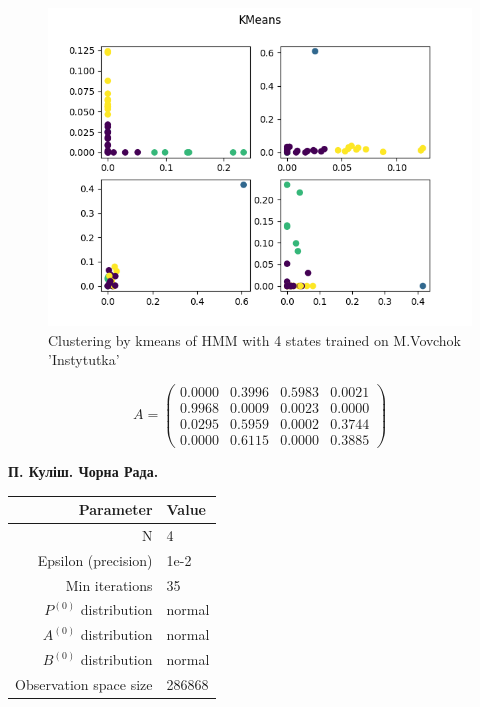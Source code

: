 \documentclass[12pt,a4paper]{article}
\begin{document}
  \begin{figure}[h]
    \includegraphics[width=\textwidth]{../plots/marko-instutytka-clustering-4-kmeans-1670787550.1034222.png}
    \centering
    \caption{Clustering by kmeans of HMM with 4 states trained on M.Vovchok 'Instytutka'}
  \end{figure}
	
  \[ A = \begin{pmatrix}
    0.0000 & 0.3996 & 0.5983 & 0.0021 \\
    0.9968 & 0.0009 & 0.0023 & 0.0000 \\
    0.0295 & 0.5959 & 0.0002 & 0.3744 \\
    0.0000 & 0.6115 & 0.0000 & 0.3885
  \end{pmatrix}  \] 

  \clearpage


  \textbf{П. Куліш. Чорна Рада.}

  \begin{center}
  \begin{tabular}{ | r | l | }
    \hline
    Parameter & Value \\
    \hline
    N & 4 \\
    \hline
    Epsilon (precision) & 1e-2 \\
    \hline
    Min iterations & 35 \\
    \hline
    $P^{(0)}$ distribution & normal \\
    \hline
    $A^{(0)}$ distribution & normal \\
    \hline
    $B^{(0)}$ distribution & normal \\
    \hline
    Observation space size & 286868 \\
    \hline
  \end{tabular}
  \end{center}
\end{document}
